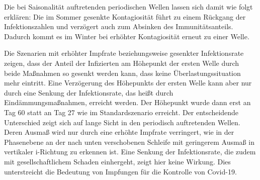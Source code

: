 \documentclass[../main.tex]{subfiles}
\begin{document}
    Die bei Saisonalität auftretenden periodischen Wellen lassen sich damit wie folgt erklären: Die im Sommer gesenkte Kontagiosität führt zu einem Rückgang der Infektionszahlen und verzögert auch zum Absinken des Immunitätsanteils. Dadurch kommt es im Winter bei erhöhter Kontagiosität erneut zu einer Welle.

    Die Szenarien mit erhöhter Impfrate beziehungsweise gesenkter Infektionsrate zeigen, dass der Anteil der Infizierten am Höhepunkt der ersten Welle durch beide Maßnahmen so gesenkt werden kann, dass keine Überlastungssituation mehr eintritt. Eine Verzögerung des Höhepunkts der ersten Welle kann aber nur durch eine Senkung der Infektionsrate, das heißt durch Eindämmungsmaßnahmen, erreicht werden. Der Höhepunkt wurde dann erst an Tag 60 statt an Tag 27 wie im Standardszenario erreicht. Der entscheidende Unterschied zeigt sich auf lange Sicht in den periodisch auftretenden Wellen. Deren Ausmaß wird nur durch eine erhöhte Impfrate verringert, wie in der Phasenebene an der nach unten verschobenen Schleife mit geringerem Ausmaß in vertikaler i-Richtung zu erkennen ist. Eine Senkung der Infektionsrate, die zudem mit gesellschaftlichem Schaden einhergeht, zeigt hier keine Wirkung.
    Dies unterstreicht die Bedeutung von Impfungen für die Kontrolle von Covid-19.
\end{document}
